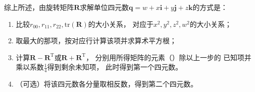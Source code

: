 综上所述，由旋转矩阵$\bm R$求解单位四元数$\bm q=w+x\mathbf{i}+y\mathbf{j}+z\mathbf{k}$的方式是：
\begin{enumerate}
    \item 比较$r_{00},r_{11},r_{22},\mathrm{tr}(\bm R)$的大小关系，
          对应于$x^2,y^2,z^2,w^2$的大小关系；
    \item 取最大的那项，按对应行计算该项并求算术平方根；
    \item 计算$\bm R-\bm R^\mathrm{T}$或$\bm R+\bm R^\mathrm{T}$，
          分别用所得矩阵的元素（）除以上一步的
          已知项并乘以系数$\displaystyle\frac{1}{4}$得到剩余未知项，
          此时得到第一个四元数。
    \item （可选）将该四元数各分量取相反数，得到第二个四元数。
\end{enumerate}
